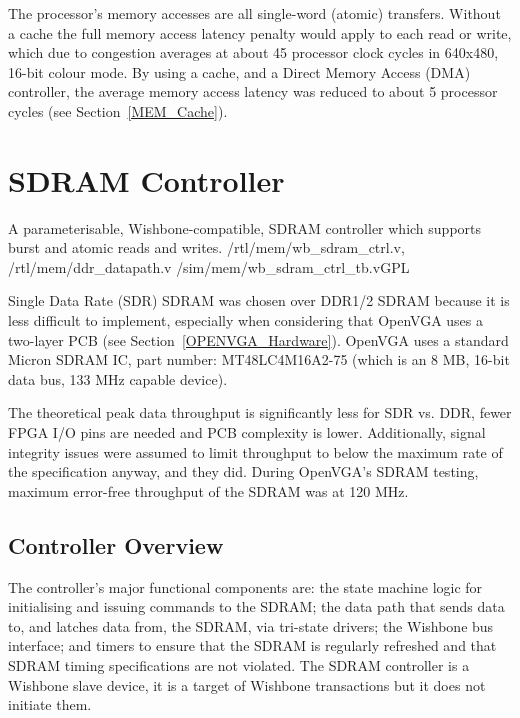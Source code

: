 The processor's memory accesses are all single-word (atomic) transfers. Without a
cache the full memory access latency penalty would apply to each read or write,
which due to congestion averages at about 45 processor clock cycles in 640x480,
16-bit colour mode. By using a cache, and a Direct Memory
Access (DMA) controller,
the average memory access latency was reduced to about 5 processor cycles (see
Section~\ref{MEM_Cache}).


\section{SDRAM Controller}
\label{MEM_SDRAM}

{A parameterisable, Wishbone-compatible, SDRAM controller which supports burst
and atomic reads and writes.} {/rtl/mem/wb\_sdram\_ctrl.v, /rtl/mem/ddr\_datapath.v}
{/sim/mem/wb\_sdram\_ctrl\_tb.v}{GPL}

Single Data Rate (SDR) SDRAM
was chosen over DDR1/2 SDRAM because it is less difficult to implement,
especially when considering that OpenVGA uses a two-layer PCB (see
Section~\ref{OPENVGA_Hardware}). OpenVGA uses a standard Micron SDRAM IC, part
number: MT48LC4M16A2-75 (which is an 8 MB, 16-bit data bus, 133 MHz capable
device\cite{Micron_SDRAM_DS}).

The theoretical peak data throughput is significantly less for SDR vs. DDR, fewer
FPGA I/O pins are needed and PCB complexity is lower. Additionally, signal
integrity issues were assumed to limit throughput to below the maximum rate of
the specification anyway, and they did. During OpenVGA's SDRAM testing, maximum
error-free throughput of the SDRAM was at 120 MHz.


\subsection{Controller Overview}
\label{SDRAM_Crtl}

The controller's major functional components are: the state machine logic for
initialising and issuing commands to the SDRAM; the data path that sends data to,
and latches data from, the SDRAM, via tri-state drivers; the Wishbone bus
interface; and timers to ensure that the SDRAM is regularly refreshed and that
SDRAM timing specifications are not violated. The SDRAM controller is a Wishbone
slave device, it is a target of Wishbone transactions but it does not initiate
them.


